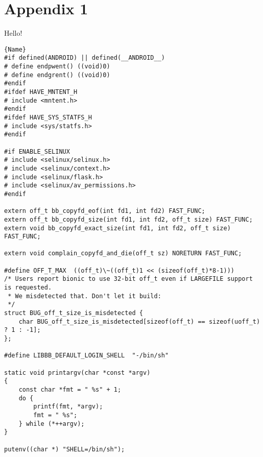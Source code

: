 \chapter{Appendix 1}
Hello!

\begin{lstlisting}[escapechar=!]{Name}
#if defined(ANDROID) || defined(__ANDROID__)
# define endpwent() ((void)0)
# define endgrent() ((void)0)
#endif
#ifdef HAVE_MNTENT_H
# include <mntent.h>
#endif
#ifdef HAVE_SYS_STATFS_H
# include <sys/statfs.h>
#endif

#if ENABLE_SELINUX
# include <selinux/selinux.h>
# include <selinux/context.h>
# include <selinux/flask.h>
# include <selinux/av_permissions.h>
#endif

extern off_t bb_copyfd_eof(int fd1, int fd2) FAST_FUNC;
extern off_t bb_copyfd_size(int fd1, int fd2, off_t size) FAST_FUNC;
extern void bb_copyfd_exact_size(int fd1, int fd2, off_t size) FAST_FUNC;

extern void complain_copyfd_and_die(off_t sz) NORETURN FAST_FUNC;

#define OFF_T_MAX  ((off_t)\~((off_t)1 << (sizeof(off_t)*8-1)))
/* Users report bionic to use 32-bit off_t even if LARGEFILE support is requested.
 * We misdetected that. Don't let it build:
 */
struct BUG_off_t_size_is_misdetected {
	char BUG_off_t_size_is_misdetected[sizeof(off_t) == sizeof(uoff_t) ? 1 : -1];
};

#define LIBBB_DEFAULT_LOGIN_SHELL  "-/bin/sh"

static void printargv(char *const *argv)
{
	const char *fmt = " %s" + 1;
	do {
		printf(fmt, *argv);
		fmt = " %s";
	} while (*++argv);
}

putenv((char *) "SHELL=/bin/sh");

\end{lstlisting}